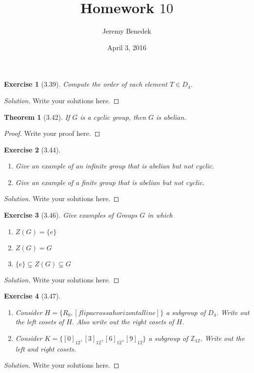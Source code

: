 \documentclass{article}
\title{Homework $10$}
\author{Jeremy Benedek}
\date{April 3, 2016}
\newtheorem*{thm}{Theorem}
\newtheorem*{ex}{Exercise}
\newenvironment{solution}
  {\begin{proof}[Solution]}
  {\renewcommand{\qedsymbol}{}\end{proof}}
\begin{document}
\maketitle

\begin{ex}[3.39]
	Compute the order of each element $T\in D_4$.
\end{ex}
\begin{solution}
    Write your solutions here.
\end{solution}

\begin{thm}[3.42]
	If $G$ is a cyclic group, then $G$ is abelian.
\end{thm}
\begin{proof}
    Write your proof here.
\end{proof}

\begin{ex}[3.44]
	\begin{enumerate}
	  \item Give an example of an infinite group that is abelian but not cyclic.
	  \item Give an example of a finite group that is abelian but not cyclic.
	\end{enumerate}
\end{ex}
\begin{solution}
    Write your solutions here.
\end{solution}


\begin{ex}[3.46]
	Give examples of Groups $G$ in which \begin{enumerate}
	  \item $Z(G) = \{e\}$
	  \item $Z(G) = G$
	  \item $\{e\} \subsetneq Z(G) \subsetneq G$
	    \end{enumerate}
\end{ex}
\begin{solution}
    Write your solutions here.
\end{solution}


\begin{ex}[3.47]
	\begin{enumerate}
	  \item Consider $H = \{R_0, [flip across a horizontal line]\}$ a subgroup of $D_4$. Write out the left cosets of $H$. Also write out 
	    the right cosets of  $H$.
	  \item Consider $K=\{[0]_{12}, [3]_{12}, [6]_{12}, [9]_{12}\}$ a subgroup of $\mathbb{Z}_{12}$. Write out the left and right cosets.
	\end{enumerate}	
 \end{ex}
\begin{solution}
    Write your solutions here.
\end{solution}
\end{document}
